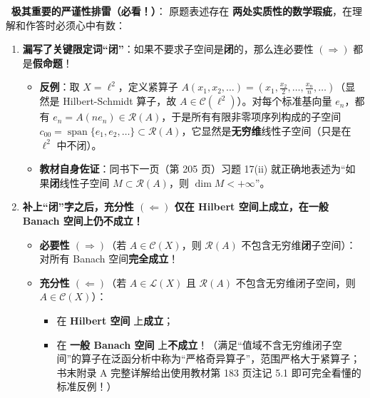 \documentclass[11pt,a4paper]{article}
\providecommand{\tightlist}{\setlength{\itemsep}{1.8pt}\setlength{\parskip}{0pt}}
\newcommand{\WarnBadge}{%
  \tcbox[on line, colback=CoralSoft, colframe=CoralMain!45!BorderColor, boxrule=0.35pt,
    arc=3pt, left=3.5pt, right=3.5pt, top=0.5pt, bottom=0.5pt, boxsep=0pt]{\scriptsize\bfseries\color{CoralMain}注意}\,%
}
\renewenvironment{quote}{%
  \begin{tcolorbox}[
    enhanced,
    breakable,
    colback=AccentSoft!48!white,
    colframe=AccentMain,
    boxrule=0pt,
    leftrule=2.8pt,
    arc=2.5pt,
    left=9pt, right=8pt, top=6pt, bottom=6pt,
    before skip=5.5pt, after skip=5.5pt
  ]\small
}{%
  \end{tcolorbox}%
}
\begin{document}
\begin{quote}
\textbf{\WarnBadge{} 极其重要的严谨性排雷（必看！）}： 原题表述存在 \textbf{两处实质性的数学瑕疵}，在理解和作答时必须心中有数：

\begin{enumerate}
\def\labelenumi{\arabic{enumi}.}
\tightlist
\item
  \textbf{漏写了关键限定词``闭''}：如果不要求子空间是\textbf{闭}的，那么连必要性 \((\Rightarrow)\) 都是\textbf{假命题}！

  \begin{itemize}
  \tightlist
  \item
    \textbf{反例}：取 \(X = \ell^2\)，定义紧算子 \(A(x_1, x_2, \dots) = \left(x_1, \frac{x_2}{2}, \dots, \frac{x_n}{n}, \dots\right)\)（显然是 Hilbert-Schmidt 算子，故 \(A \in \mathcal{C}(\ell^2)\)）。对每个标准基向量 \(e_n\)，都有 \(e_n = A(ne_n) \in \mathcal{R}(A)\)，于是所有有限非零项序列构成的子空间 \(c_{00} = \operatorname{span}\{e_1, e_2, \dots\} \subset \mathcal{R}(A)\)，它显然是\textbf{无穷维}线性子空间（只是在 \(\ell^2\) 中不闭）。
  \item
    \textbf{教材自身佐证}：同书下一页（第 205 页）习题 17(ii) 就正确地表述为``如果\textbf{闭}线性子空间 \(M \subset \mathcal{R}(A)\)，则 \(\dim M < +\infty\)''。
  \end{itemize}
\item
  \textbf{补上``闭''字之后，充分性 \((\Leftarrow)\) 仅在 Hilbert 空间上成立，在一般 Banach 空间上仍不成立！}

  \begin{itemize}
  \tightlist
  \item
    \textbf{必要性 \((\Rightarrow)\)}（若 \(A \in \mathcal{C}(X)\)，则 \(\mathcal{R}(A)\) 不包含无穷维\textbf{闭}子空间）：对所有 Banach 空间\textbf{完全成立}！
  \item
    \textbf{充分性 \((\Leftarrow)\)}（若 \(A \in \mathcal{L}(X)\) 且 \(\mathcal{R}(A)\) 不包含无穷维闭子空间，则 \(A \in \mathcal{C}(X)\)）：

    \begin{itemize}
    \tightlist
    \item
      在 \textbf{Hilbert 空间} 上\textbf{成立}；
    \item
      在 \textbf{一般 Banach 空间} 上\textbf{不成立}！（满足``值域不含无穷维闭子空间''的算子在泛函分析中称为``严格奇异算子''，范围严格大于紧算子；书末附录 A 完整详解给出使用教材第 183 页注记 5.1 即可完全看懂的标准反例！）
    \end{itemize}
  \end{itemize}
\end{enumerate}
\end{quote}
\end{document}
